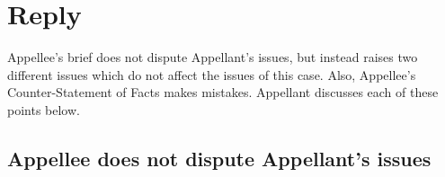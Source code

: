 \documentclass[12pt,\documentclassflag]{michiganCourtOfAppealsBrief}
\begin{document}





\section{Reply}

Appellee's brief does not dispute Appellant's issues, but instead raises two different issues which do not affect the issues of this case.
Also, Appellee's Counter-Statement of Facts makes mistakes.
Appellant discusses each of these points below.

\subsection{Appellee does not dispute Appellant's issues}
\end{document}
